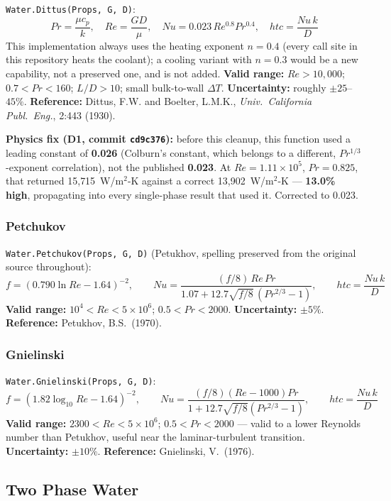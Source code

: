 \documentclass[11pt]{article}
\newcommand{\code}[1]{\texttt{#1}}
\begin{document}
\code{Water.Dittus(Props, G, D)}:
\[
  Pr = \frac{\mu c_p}{k}, \quad Re = \frac{GD}{\mu}, \quad Nu = 0.023\,Re^{0.8}Pr^{0.4},
  \quad htc = \frac{Nu\,k}{D}
\]
This implementation always uses the heating exponent $n=0.4$ (every call site in this
repository heats the coolant); a cooling variant with $n=0.3$ would be a new capability,
not a preserved one, and is not added. \textbf{Valid range:} $Re>10{,}000$;
$0.7<Pr<160$; $L/D>10$; small bulk-to-wall $\Delta T$. \textbf{Uncertainty:} roughly
$\pm25$--$45\%$. \textbf{Reference:} Dittus, F.W. and Boelter, L.M.K., \emph{Univ.\
California Publ.\ Eng.}, 2:443 (1930).

\textbf{Physics fix (D1, commit \code{cd9c376}):} before this cleanup, this function
used a leading constant of \textbf{0.026} (Colburn's constant, which belongs to a
different, $Pr^{1/3}$-exponent correlation), not the published \textbf{0.023}. At
$Re=1.11\times10^5$, $Pr=0.825$, that returned 15{,}715~W/m$^2$-K against a correct
13{,}902~W/m$^2$-K --- \textbf{13.0\% high}, propagating into every single-phase result
that used it. Corrected to 0.023.

\subsubsection{Petchukov}

\code{Water.Petchukov(Props, G, D)} (Petukhov, spelling preserved from the original
source throughout):
\[
  f = (0.790\ln Re - 1.64)^{-2}, \qquad
  Nu = \frac{(f/8)\,Re\,Pr}{1.07 + 12.7\sqrt{f/8}\,(Pr^{2/3}-1)}, \qquad htc=\frac{Nu\,k}{D}
\]
\textbf{Valid range:} $10^4<Re<5\times10^6$; $0.5<Pr<2000$. \textbf{Uncertainty:}
$\pm5\%$. \textbf{Reference:} Petukhov, B.S.\ (1970).

\subsubsection{Gnielinski}

\code{Water.Gnielinski(Props, G, D)}:
\[
  f = (1.82\log_{10}Re - 1.64)^{-2}, \qquad
  Nu = \frac{(f/8)(Re-1000)Pr}{1+12.7\sqrt{f/8}(Pr^{2/3}-1)}, \qquad htc=\frac{Nu\,k}{D}
\]
\textbf{Valid range:} $2300<Re<5\times10^6$; $0.5<Pr<2000$ --- valid to a lower
Reynolds number than Petukhov, useful near the laminar-turbulent transition.
\textbf{Uncertainty:} $\pm10\%$. \textbf{Reference:} Gnielinski, V.\ (1976).

\subsection{Two Phase Water}
\end{document}
